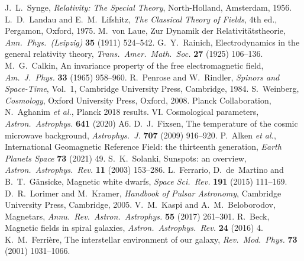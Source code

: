  J.~L.~Synge, \emph{Relativity: The Special Theory}, North-Holland, Amsterdam, 1956.
 L.~D.~Landau and E.~M.~Lifshitz, \emph{The Classical Theory of Fields}, 4th ed., Pergamon, Oxford, 1975.
 M.~von Laue, Zur Dynamik der Relativit\"atstheorie, \emph{Ann.\ Phys.\ (Leipzig)} \textbf{35} (1911) 524--542.
 G.~Y.~Rainich, Electrodynamics in the general relativity theory, \emph{Trans.\ Amer.\ Math.\ Soc.} \textbf{27} (1925) 106--136.
 M.~G.~Calkin, An invariance property of the free electromagnetic field, \emph{Am.\ J.\ Phys.} \textbf{33} (1965) 958--960.
 R.~Penrose and W.~Rindler, \emph{Spinors and Space-Time}, Vol.~1, Cambridge University Press, Cambridge, 1984.
 S.~Weinberg, \emph{Cosmology}, Oxford University Press, Oxford, 2008.
 Planck Collaboration, N.~Aghanim \emph{et al.}, Planck 2018 results. VI. Cosmological parameters, \emph{Astron.\ Astrophys.} \textbf{641} (2020) A6.
 D.~J.~Fixsen, The temperature of the cosmic microwave background, \emph{Astrophys.\ J.} \textbf{707} (2009) 916--920.
 P.~Alken \emph{et al.}, International Geomagnetic Reference Field: the thirteenth generation, \emph{Earth Planets Space} \textbf{73} (2021) 49.
 S.~K.~Solanki, Sunspots: an overview, \emph{Astron.\ Astrophys.\ Rev.} \textbf{11} (2003) 153--286.
 L.~Ferrario, D.~de~Martino and B.~T.~G\"ansicke, Magnetic white dwarfs, \emph{Space Sci.\ Rev.} \textbf{191} (2015) 111--169.
 D.~R.~Lorimer and M.~Kramer, \emph{Handbook of Pulsar Astronomy}, Cambridge University Press, Cambridge, 2005.
 V.~M.~Kaspi and A.~M.~Beloborodov, Magnetars, \emph{Annu.\ Rev.\ Astron.\ Astrophys.} \textbf{55} (2017) 261--301.
 R.~Beck, Magnetic fields in spiral galaxies, \emph{Astron.\ Astrophys.\ Rev.} \textbf{24} (2016) 4.
 K.~M.~Ferri\`ere, The interstellar environment of our galaxy, \emph{Rev.\ Mod.\ Phys.} \textbf{73} (2001) 1031--1066.
